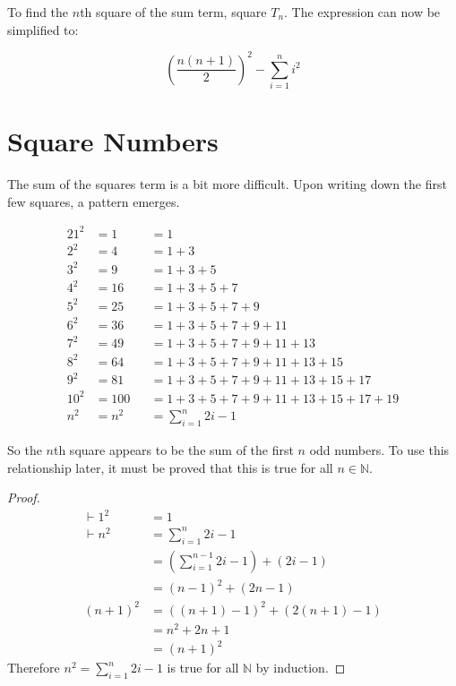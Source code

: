\documentclass[final,letterpaper]{article}
\begin{document}
To find the $n$th square of the sum term, square $T_n$. The expression can now
be simplified to:

\[
	{\left(\frac{n (n + 1)}{2}\right)}^2 - \sum_{i=1}^{n}{i^2}
\]

\section{Square Numbers}

The sum of the squares term is a bit more difficult. Upon writing down the first
few squares, a pattern emerges.

\begin{alignat*}{2}
	1^2  &= 1   &&= 1 \\
	2^2  &= 4   &&= 1 + 3 \\
	3^2  &= 9   &&= 1 + 3 + 5 \\
	4^2  &= 16  &&= 1 + 3 + 5 + 7 \\
	5^2  &= 25  &&= 1 + 3 + 5 + 7 + 9 \\
	6^2  &= 36  &&= 1 + 3 + 5 + 7 + 9 + 11 \\
	7^2  &= 49  &&= 1 + 3 + 5 + 7 + 9 + 11 + 13 \\
	8^2  &= 64  &&= 1 + 3 + 5 + 7 + 9 + 11 + 13 + 15 \\
	9^2  &= 81  &&= 1 + 3 + 5 + 7 + 9 + 11 + 13 + 15 + 17 \\
	10^2 &= 100 &&= 1 + 3 + 5 + 7 + 9 + 11 + 13 + 15 + 17 + 19 \\
	n^2  &= n^2 &&= \sum_{i=1}^{n}{2i - 1}
\end{alignat*}

So the $n$th square appears to be the sum of the first $n$ odd numbers. To use
this relationship later, it must be proved that this is true for all $n
\in \mathds{N}$.

\begin{proof}
	\begin{align*}
		\vdash 1^2
		&= 1 \\
		\vdash n^2
		&= \sum_{i=1}^{n}{2i - 1} \\
		&= \left(\sum_{i=1}^{n - 1}{2i - 1}\right) + (2i - 1) \\
		&= {(n - 1)}^2 + (2n - 1) \\
		{(n + 1)}^2
		&= {((n + 1) - 1)}^2 + (2 (n + 1) - 1) \\
		&= n^2 + 2n + 1 \\
		&= {(n + 1)}^2
	\end{align*}
	Therefore $n^2 = \sum_{i=1}^{n}{2i - 1}$ is true for all $\mathds{N}$ by
	induction.
\end{proof}
\end{document}
